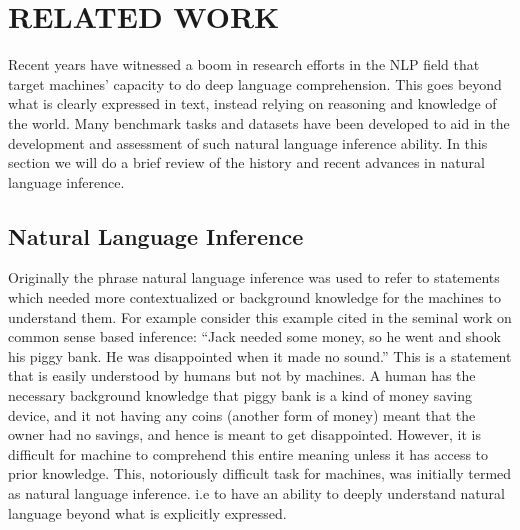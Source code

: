 \chapter{RELATED WORK\label{chapter:related_work}}






Recent years have witnessed a boom in research efforts in the NLP field that target machines' capacity to do deep language comprehension. This goes beyond what is clearly expressed in text, instead relying on reasoning and knowledge of the world. Many benchmark tasks and datasets have been developed to aid in the development and assessment of such natural language inference ability. In this section we will do a brief review of the history and recent advances in natural language inference.

\section{Natural Language Inference}
Originally the phrase natural language inference was used to refer to statements which needed more contextualized or background knowledge for the machines to understand them. For example consider this example cited in the seminal  \citep{minsky2000commonsense} work on common sense based inference: “Jack needed some money, so he went
and shook his piggy bank. He was disappointed when it made no sound.” This is a statement that is easily understood by humans but not by machines. A human has the necessary background knowledge that piggy bank is a kind of money saving device, and it not having any coins (another form of money) meant that the owner had no savings, and hence is meant to get disappointed. However, it is difficult for machine to comprehend this entire meaning unless it has access to prior knowledge. This, notoriously difficult task for machines, was initially termed as natural language inference. i.e to have an ability to deeply understand natural language beyond what is explicitly expressed. 

